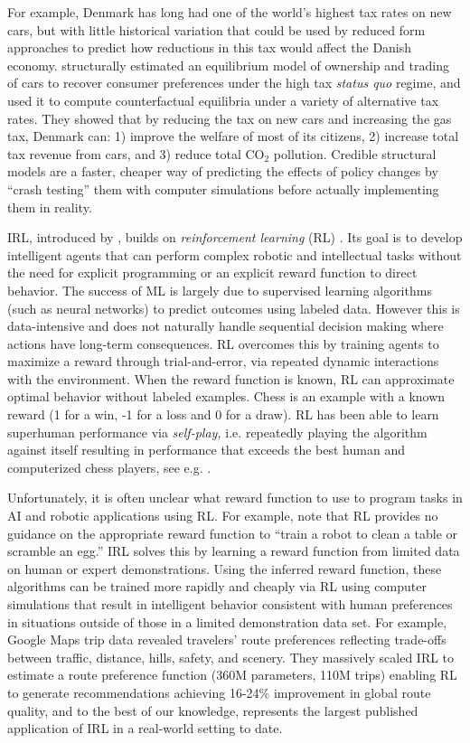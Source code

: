 For example, Denmark has long had one of the world's highest tax rates on new cars, but with little historical variation 
that could be used by reduced form approaches to predict how reductions in this tax would affect the Danish economy.
\citet{GIMRS:2022} structurally estimated an equilibrium model of ownership and trading of cars to recover consumer preferences
under the high tax {\it status quo\/} regime, and used it to compute counterfactual equilibria under a variety of alternative tax rates.
They showed that by reducing the tax on new cars and increasing the gas tax, Denmark can: 1) improve the welfare of most of its citizens,
2) increase total tax revenue from cars, and 3) reduce total $\mbox{CO}_2$ pollution.
Credible structural models are a faster, cheaper way of predicting the effects of policy changes by 
``crash testing'' them with computer simulations before actually implementing them in reality.

IRL, introduced by \citet{ng:2000}, builds on {\it reinforcement learning\/} (RL) \citep{BartoSutton:1998}. Its goal is to develop intelligent agents that can perform complex robotic and intellectual tasks without
the need for explicit programming or an explicit reward function to direct behavior. The success of ML 
is largely due to supervised learning algorithms (such as neural networks) to predict outcomes using labeled data. 
However this is data-intensive and does not naturally handle sequential decision making 
where actions have long-term consequences. RL overcomes this by training agents to maximize a reward through trial-and-error,
via repeated dynamic interactions with the environment. 
When the reward function is known, RL can  approximate optimal behavior without labeled examples. Chess is an example with a known reward (1 for a win, -1 for a loss and 0 for a draw). RL has been able to learn superhuman performance via {\it self-play,\/} i.e. repeatedly playing the algorithm against itself resulting in performance that exceeds the best human and computerized chess players, see e.g. \citet{Silver:2018}.

Unfortunately, it is often unclear what reward function to use to program tasks in AI and robotic applications using RL.
For example, \citet{christiano:2017} note that RL provides no guidance on the appropriate reward function to 
``train a robot to clean a table or scramble an egg.''  
IRL solves this by learning a reward function from limited data on human or expert demonstrations. Using the inferred reward function, 
these algorithms can be  trained more rapidly and cheaply via RL using computer simulations that result in
 intelligent behavior consistent with human preferences in situations outside of those in a limited demonstration
data set.
For example, Google Maps trip data \citep{Barnes:2024} revealed travelers' route preferences reflecting trade-offs between traffic, distance, hills, safety, and scenery. They massively scaled IRL to estimate a route preference function (360M parameters, 110M trips) enabling RL to generate recommendations achieving 16-24\% improvement in global route quality, and to the best of our knowledge, represents the largest published application of IRL in a real-world setting to date.

